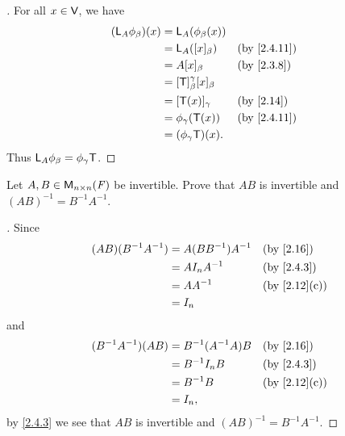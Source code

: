 \begin{proof}[]
  For all \(x \in \mathsf{V}\), we have
  \begin{align*}
    (\L_A \phi_{\beta})(x) & = \L_A(\phi_{\beta}(x))                                            \\
                           & = \L_A([x]_{\beta})                 &  & \text{(by \cref{2.4.11})} \\
                           & = A [x]_{\beta}                     &  & \text{(by \cref{2.3.8})}  \\
                           & = [\T]_{\beta}^{\gamma} [x]_{\beta}                                \\
                           & = [\T(x)]_{\gamma}                  &  & \text{(by \cref{2.14})}   \\
                           & = \phi_{\gamma}(\T(x))              &  & \text{(by \cref{2.4.11})} \\
                           & = (\phi_{\gamma} \T)(x).
  \end{align*}
  Thus \(\mathsf{L}_A \phi_{\beta} = \phi_{\gamma} \mathsf{T}\).
\end{proof}

\exercisesection

\setcounter{ex}{3}
\begin{ex}\label{ex:2.4.4}
  Let \(A, B \in \mathsf{M}_{{n} \times n}({\mathit{F}})\) be invertible.
  Prove that \(AB\) is invertible and \((AB)^{-1} = B^{-1} A^{-1}\).
\end{ex}

\begin{proof}[]
  Since
  \begin{align*}
    (AB) (B^{-1} A^{-1}) & = A (B B^{-1}) A^{-1} &  & \text{(by \cref{2.16})}    \\
                         & = A I_n A^{-1}        &  & \text{(by \cref{2.4.3})}   \\
                         & = A A^{-1}            &  & \text{(by \cref{2.12}(c))} \\
                         & = I_n
  \end{align*}
  and
  \begin{align*}
    (B^{-1} A^{-1}) (AB) & = B^{-1} (A^{-1} A) B &  & \text{(by \cref{2.16})}    \\
                         & = B^{-1} I_n B        &  & \text{(by \cref{2.4.3})}   \\
                         & = B^{-1} B            &  & \text{(by \cref{2.12}(c))} \\
                         & = I_n,
  \end{align*}
  by \cref{2.4.3} we see that \(AB\) is invertible and \((AB)^{-1} = B^{-1} A^{-1}\).
\end{proof}


